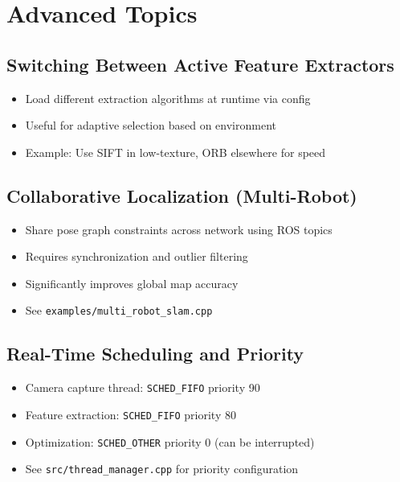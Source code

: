 \section{Advanced Topics}

\subsection{Switching Between Active Feature Extractors}
\begin{itemize}
    \item Load different extraction algorithms at runtime via config
    \item Useful for adaptive selection based on environment
    \item Example: Use SIFT in low-texture, ORB elsewhere for speed
\end{itemize}

\subsection{Collaborative Localization (Multi-Robot)}
\begin{itemize}
    \item Share pose graph constraints across network using ROS topics
    \item Requires synchronization and outlier filtering
    \item Significantly improves global map accuracy
    \item See \texttt{examples/multi\_robot\_slam.cpp}
\end{itemize}

\subsection{Real-Time Scheduling and Priority}
\begin{itemize}
    \item Camera capture thread: \texttt{SCHED\_FIFO} priority 90
    \item Feature extraction: \texttt{SCHED\_FIFO} priority 80
    \item Optimization: \texttt{SCHED\_OTHER} priority 0 (can be interrupted)
    \item See \texttt{src/thread\_manager.cpp} for priority configuration
\end{itemize}





